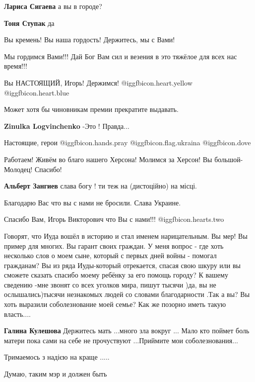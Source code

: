 \begin{itemize}
\textbf{Лариса Сигаева} а вы в городе?

\textbf{Тоня Ступак} да

Вы кремень! Вы наша гордость! Держитесь, мы с Вами!

Мы гордимся Вами!!! Дай Бог Вам сил и везения в это тяжёлое для всех нас время!!!

Вы НАСТОЯЩИЙ, Игорь! Держимся! @igg{fbicon.heart.yellow}  @igg{fbicon.heart.blue} 

Может хотя бы чиновникам премии прекратите выдавать.


\textbf{Zinulka Logvinchenko} -Это ! Правда...

Настоящие, герои @igg{fbicon.hands.pray} @igg{fbicon.flag.ukraina} @igg{fbicon.dove} ️

Работаем! Живём во благо нашего Херсона! Молимся за Херсон! Вы большой- Молодец! Спасибо!

\textbf{Альберт Зангиев} слава богу ! ти теж на (дистоційно) на місці.

Благодарю Вас что вы с нами не бросили. Слава Украине.

Спасибо Вам, Игорь Викторович что Вы с нами!!! @igg{fbicon.hearts.two} 


Говорят, что Иуда вошёл в историю и стал именем нарицательным. Вы мер! Вы пример
для многих. Вы гарант своих граждан. У меня вопрос - где хоть несколько слов о моем
сыне, который с первых дней войны - помогал гражданам? Вы из ряда Иуды-который
отрекается, спасая свою шкуру или вы сможете сказать спасибо моему ребёнку за
его помощь городу? К вашему сведению -мне звонят со всех уголков мира, пишут
тысячи )да, вы не ослышались)тысячи незнакомых людей со словами благодарности
.Так а вы? Вы хоть выразили соболезнование моей семье? Как же позорно иметь
такую власть....

\textbf{Галина Кулешова} Держитесь мать ...много зла вокруг ... Мало кто поймет боль матери пока сами на себе не прочуствуют ...Приймите мои соболезнования...

Тримаемось з надією на краще .....

Думаю, таким мэр и должен быть


\end{itemize}
